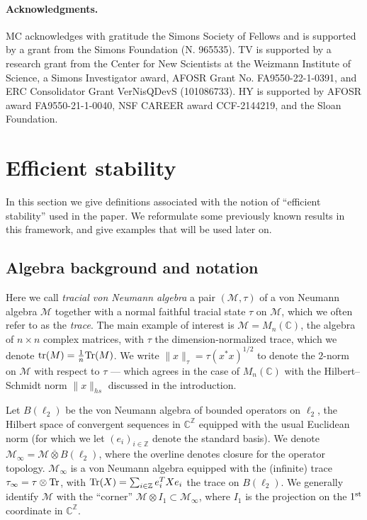 \documentclass[11pt]{article}
\theoremstyle{definition}
\newcommand{\Tr}{\mbox{\rm Tr}}
\newcommand{\Id}{\ensuremath{I}}
\newcommand{\C}{\ensuremath{\mathbb{C}}}
\newcommand{\complex}{\ensuremath{\mathbb{C}}}
\newcommand{\Z}{\ensuremath{\mathbb{Z}}}
\newcommand{\mM}{\ensuremath{\mathcal{M}}}
\DeclareMathOperator{\tr}{tr}
\begin{document}
\paragraph{Acknowledgments.} 
MC acknowledges with gratitude the Simons Society of Fellows and is supported by a grant from the Simons Foundation (N. 965535). 
TV is supported by a research grant from the Center for New Scientists at the Weizmann Institute of Science, a Simons Investigator award, AFOSR Grant No. FA9550-22-1-0391, and ERC Consolidator Grant VerNisQDevS (101086733). HY is supported by AFOSR award FA9550-21-1-0040, NSF CAREER award CCF-2144219, and the Sloan Foundation.


\section{Efficient stability}
\label{sec:efficient}

In this section we give definitions associated with the notion of ``efficient stability'' used in the paper. We reformulate some previously known results in this framework, and give examples that will be used later on. 


\subsection{Algebra background and notation}

  Here we call \emph{tracial von Neumann algebra} a pair $(\mM,\tau)$ of a von Neumann algebra $\mM$ together with a normal faithful tracial state $\tau$ on $\mM$, which we often refer to as the \emph{trace}. The main example of interest is $\mM=M_n(\C)$, the algebra of $n\times n$ complex matrices, with $\tau$ the dimension-normalized trace, which we denote $\tr(M)=\frac{1}{n}\Tr(M)$. 	We write $\|x\|_\tau=\tau(x^*x)^{1/2}$ to denote the $2$-norm on $\mM$ with respect to $\tau$ --- which agrees in the case of $M_n(\complex)$ with the Hilbert--Schmidt norm $\|x\|_{hs}$ discussed in the introduction.
	
	Let $B(\ell_2)$ be the von Neumann algebra of bounded operators on $\ell_2$, the Hilbert space of convergent sequences in $\C^\Z$ equipped with the usual Euclidean norm (for which we let $(e_i)_{i \in \Z}$ denote the standard basis). We denote $\mM_\infty = \mM \overline{\otimes} B(\ell_2)$, where the overline denotes closure for the operator topology. $\mM_\infty$ is a von Neumann algebra equipped with the (infinite) trace $\tau_\infty = \tau \otimes \Tr$, with $\Tr(X)=\sum_{i\in \Z} e_i^T X e_i$ the trace on $B(\ell_2)$. We generally identify $\mM$ with the ``corner'' $\mM\otimes \Id_{1}\subset \mM_\infty$, where $\Id_1$ is the projection on the $1^{\rm st}$ coordinate in $\complex^\Z$.
\end{document}
